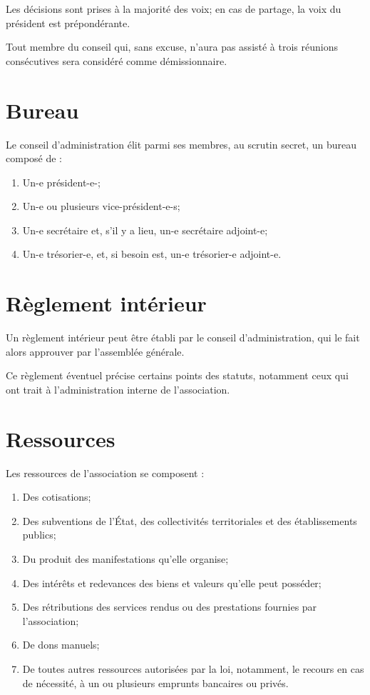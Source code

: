\documentclass[12pt]{constitution}
\begin{document}
	Les décisions sont prises à la majorité des voix; en cas de partage, la voix du président est prépondérante. 
	
	\medskip
	Tout membre du conseil qui, sans excuse, n'aura pas assisté à trois réunions consécutives sera considéré comme démissionnaire. 
	
	\section{Bureau}
	Le conseil d'administration élit parmi ses membres, au scrutin secret, un bureau composé de :
	\begin{enumerate}
		\item Un-e président-e-;
		\item Un-e ou plusieurs vice-président-e-s;
		\item Un-e secrétaire et, s'il y a lieu, un-e secrétaire adjoint-e;
		\item Un-e trésorier-e, et, si besoin est, un-e trésorier-e adjoint-e. 
	\end{enumerate}
	
	\section{Règlement intérieur}
	Un règlement intérieur peut être établi par le conseil d’administration, qui le fait alors approuver par l’assemblée générale.
	
	Ce règlement éventuel précise certains points des statuts, notamment ceux qui ont trait à l’administration interne de l’association.
	
	
	\section{Ressources}
	Les ressources de l’association se composent :
	\begin{enumerate}
		\item Des cotisations;
		\item Des subventions de l’État, des collectivités territoriales et des établissements publics;
		\item Du produit des manifestations qu’elle organise;
		\item Des intérêts et redevances des biens et valeurs qu’elle peut posséder;
		\item Des rétributions des services rendus ou des prestations fournies par l'association;
		\item De dons manuels;
		\item De toutes autres ressources autorisées par la loi, notamment, le recours en cas de
		nécessité, à un ou plusieurs emprunts bancaires ou privés.
	\end{enumerate}
	
\end{document}
